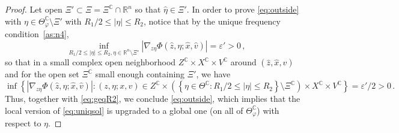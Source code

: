 \documentclass[
	fontsize=11pt, 
	twoside=false, 
	abstract=true, 
	a4paper,
]{scrartcl}
\newcommand{\eps}{\varepsilon}
\newcommand{\RR}{\mathbb{R}}
\newcommand{\CC}{\mathbb{C}}
\newcommand{\dd}{\mathrm{d}}
\newcommand{\abs}[1]{\left\lvert#1\right\rvert}
\newcommand{\del}{\partial}
\begin{document}
\begin{proof}
	Let open $\Xi'\subset \Xi = \Xi^\CC\cap \RR^n$ so that $\hat\eta\in\Xi'$. In order to prove \cref{eq:outside} with $\eta\in\Theta_\varphi^{\CC}\setminus\Xi'$ with $R_1/2 \leq \abs{\eta} \leq R_2$, notice that by the unique frequency condition~\ref{as:n4},
	\[
		\inf_{R_1/2 \leq \abs{\eta} \leq R_2, \eta\in\RR^n\setminus\Xi'} \abs{\nabla_{z\eta}\Phi(\hat z,\eta;\hat x,\hat v)} = \eps' > 0\,,
	\]
	so that in a small complex open neighborhood $Z^{\CC}\times X^{\CC}\times V^{\CC}$ around $(\hat z,\hat x,\hat v)$ and for the open set $\Xi^\CC$ small enough containing $\Xi'$, we have
	\[
		\inf\left\{\abs{\nabla_{z\eta}\Phi(\hat z,\eta;\hat x,\hat v)}\colon (z,\eta;x,v) \in Z^{\CC}\times \left(\left\{\eta\in\Theta^{\CC}\colon R_1/2 \leq \abs{\eta} \leq R_2\right\}\setminus\Xi^{\CC}\right)\times X^{\CC}\times V^{\CC} \right\} = \eps'/2 > 0\,.
	\]
	Thus, together with \cref{eq:geqR2}, we conclude \cref{eq:outside}, which implies that the local version of \cref{eq:uniqsol} is upgraded to a global one (on all of $\Theta^{\CC}_\varphi$) with respect to $\eta$.
\end{proof}
%
%
%
%
\end{document}

